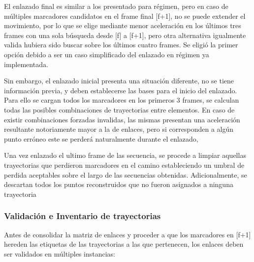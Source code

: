 El enlazado final es similar a los presentado para régimen, pero en caso de múltiples marcadores candidatos en el frame final [f+1], no se puede extender el movimiento, por lo que se elige mediante menor aceleración en los últimos tres frames con una sola búsqueda desde [f] a [f+1], pero otra alternativa igualmente valida hubiera sido buscar sobre los últimos cuatro frames. Se eligió la primer opción debido a  ser un caso simplificado del enlazado en régimen ya implementada. 

Sin embargo, el enlazado inicial presenta una situación diferente, no se tiene información previa, y deben establecerse las bases para el inicio del enlazado. Para ello se cargan todos los marcadores en los primeros 3 frames, se calculan todas las posibles combinaciones de trayectorias entre elementos. En caso de existir combinaciones forzadas invalidas, las mismas presentan una aceleración resultante notoriamente mayor a la de enlaces, pero si corresponden a algún punto erróneo este se perderá naturalmente durante el enlazado,

Una vez enlazado el ultimo frame de las secuencia, se procede a limpiar aquellas trayectorias que perdieron marcadores en el camino estableciendo un umbral de perdida aceptables sobre el largo de las secuencias obtenidas. Adicionalmente, se descartan todos los puntos reconstruidos que no fueron asignados a ninguna trayectoria 


\subsubsection{Validación e Inventario de trayectorias}

Antes de consolidar la matriz de enlaces y proceder a que los marcadores en [f+1] hereden las etiquetas de las trayectorias a las que pertenecen, los enlaces deben ser validados en múltiples instancias:

